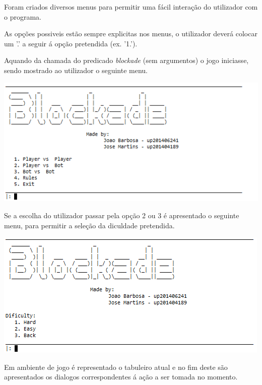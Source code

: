 \documentclass[a4paper]{article}
\begin{document}
Foram criados diversos menus para permitir uma fácil interação do utilizador com o programa.
\par As opções possiveis estão sempre explicitas nos menus, o utilizador deverá colocar um '.' a seguir á opção pretendida  (ex. '1.').
\par Aquando da chamada do predicado \textit{blockade} (sem argumentos) o jogo iniciasse, sendo mostrado ao utilizador o seguinte menu.

\begin{center}
	\includegraphics[scale = 0.7]{fig5.png}
\end{center}

Se a escolha do utilizador passar pela opção 2 ou 3 é apresentado o seguinte menu, para permitir a seleção da diculdade pretendida.

\begin{center}
	\includegraphics[scale = 0.7]{fig6.png}
\end{center}

Em ambiente de jogo é representado o tabuleiro atual e no fim deste são apresentados os dialogos correspondentes á ação a ser tomada no momento.
\end{document}
